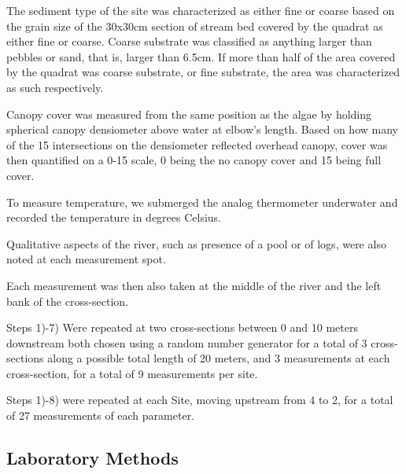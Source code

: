 \documentclass{article}\usepackage[]{graphicx}\usepackage[]{color}
\begin{document}
The sediment type of the site was characterized as either fine or coarse based on the grain size of the 30x30cm section of stream bed covered by the quadrat as either fine or coarse. Coarse substrate was classified as anything larger than pebbles or sand, that is, larger than 6.5cm. If more than half of the area covered by the quadrat was coarse substrate, or fine substrate, the area was characterized as such respectively.

Canopy cover was measured from the same position as the algae by holding spherical canopy densiometer above water at elbow’s length. Based on how many of the 15 intersections on the densiometer reflected overhead canopy, cover was then quantified on a 0-15 scale, 0 being the no canopy cover and 15 being full cover.

To measure temperature, we submerged the analog thermometer underwater and recorded the temperature in degrees Celsius.

Qualitative aspects of the river, such as presence of a pool or of logs, were also noted at each measurement spot.

Each measurement was then also taken at the middle of the river and the left bank of the cross-section. 

Steps 1)-7) Were repeated at two cross-sections between 0 and 10 meters downstream both chosen using a random number generator for a total of 3 cross-sections along a possible total length of 20 meters, and 3 measurements at each cross-section, for a total of 9 measurements per site. 


Steps 1)-8) were repeated at each Site, moving upstream from 4 to 2, for a total of 27 measurements of each parameter.


\subsection{Laboratory Methods}
\end{document}
